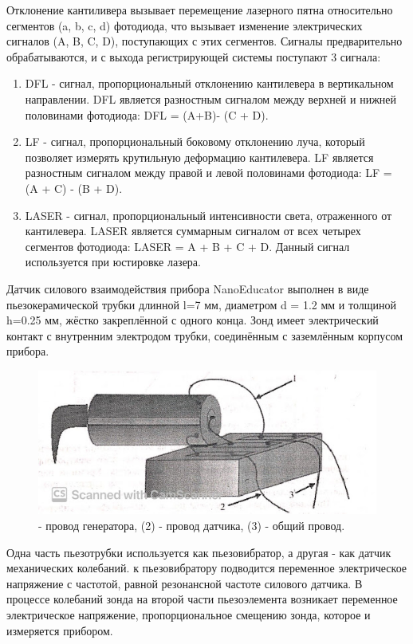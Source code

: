 \documentclass[a4paper,12pt]{article}
\theoremstyle{plain} %
\theoremstyle{definition} %
\theoremstyle{remark} %
\begin{document}
Отклонение кантиливера вызывает перемещение лазерного пятна относительно сегментов (a, b, c, d) фотодиода, что вызывает изменение электрических сигналов (A, B, C, D), поступающих с этих сегментов. Сигналы предварительно обрабатываются, и с выхода регистрирующей системы поступают 3 сигнала:
\begin{enumerate}
	\item
	DFL - сигнал, пропорциональный отклонению кантилевера в вертикальном направлении. DFL является разностным сигналом между верхней и нижней половинами фотодиода: DFL = (A+B)- (C + D). 
	\item
	LF - сигнал, пропорциональный боковому отклонению луча, который позволяет измерять крутильную деформацию кантилевера. LF является разностным сигналом между правой и левой половинами фотодиода: LF = (A + C) - (B + D). 
	\item
	LASER - сигнал, пропорциональный интенсивности света, отраженного от кантилевера. LASER является суммарным сигналом от всех четырех сегментов фотодиода: LASER = A + B + C + D. Данный сигнал используется при юстировке лазера. 
\end{enumerate}
Датчик силового взаимодействия прибора NanoEducator выполнен в виде пьезокерамической трубки длинной l=7 мм, диаметром d = 1.2 мм и толщиной h=0.25 мм, жёстко закреплённой с одного конца. Зонд имеет электрический контакт с внутренним электродом трубки, соединённым с заземлённым корпусом прибора.
\begin{figure}[h!]
	\centering
	\includegraphics[scale=0.6]{pic6.jpg}
	\caption{- провод генератора, (2) - провод датчика, (3) - общий провод.}
	\label{pic6}
\end{figure}
Одна часть пьезотрубки используется как пьезовибратор, а другая - как датчик механических колебаний. к пьезовибратору подводится переменное электрическое напряжение с частотой, равной резонансной частоте силового датчика. В процессе колебаний зонда на второй части пьезоэлемента возникает переменное электрическое напряжение, пропорциональное смещению зонда, которое и измеряется прибором.
\end{document}

